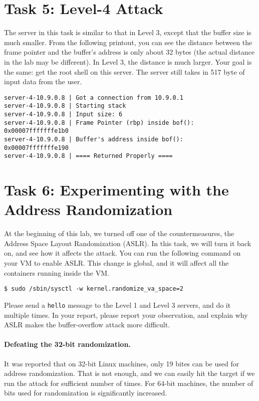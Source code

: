 \section{Task 5: Level-4 Attack} 

The server in this task is similar to that in Level 3, 
except that the buffer size is much smaller. From the 
following printout, you can see the distance between 
the frame pointer and the buffer's address is only about 32 bytes (the 
actual distance in the lab may be different).
In Level 3, the distance is much larger. Your goal is the same: 
get the root shell on this server. The server still takes in
517 byte of input data from the user.


\begin{lstlisting}
server-4-10.9.0.8 | Got a connection from 10.9.0.1
server-4-10.9.0.8 | Starting stack
server-4-10.9.0.8 | Input size: 6
server-4-10.9.0.8 | Frame Pointer (rbp) inside bof():  0x00007fffffffe1b0
server-4-10.9.0.8 | Buffer's address inside bof():     0x00007fffffffe190
server-4-10.9.0.8 | ==== Returned Properly ====
\end{lstlisting}
 

\section{Task 6: Experimenting with the Address Randomization}

At the beginning of this lab, we turned off one of the countermeasures,
the Address Space Layout Randomization (ASLR). In this task, we will turn
it back on, and see how it affects the attack. You can run 
the following command on your VM to enable ASLR. This change is global, and 
it will affect all the containers running inside the VM.


\begin{lstlisting}
$ sudo /sbin/sysctl -w kernel.randomize_va_space=2
\end{lstlisting}

Please send a \texttt{hello} message to the Level 1 and Level 3 servers,
and do it multiple times.
In your report, please report your observation, and explain why
ASLR makes the buffer-overflow attack more difficult. 


\paragraph{Defeating the 32-bit randomization.}
It was reported that on 32-bit Linux machines, only 19 bites can be used 
for address randomization.
That is not enough, and we can easily hit the target 
if we run the attack for sufficient number of times. For 64-bit 
machines, the number of bits used for randomization is 
significantly increased. 

